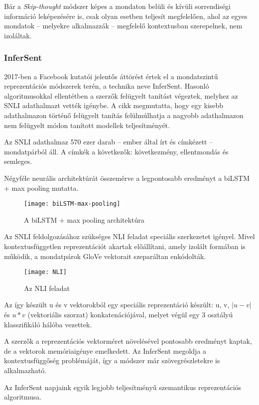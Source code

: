 Bár a \textit{Skip-thought} módszer képes a mondaton belüli és kívüli sorrendiségi információ leképezésére is, csak olyan esetben teljesít megfelelően, ahol az egyes mondatok – melyekre alkalmazzák – megfelelő kontextusban szerepelnek, nem izoláltak.

\subsubsection{InferSent}
2017-ben a Facebook kutatói jelentős áttörést értek el a mondatszintű reprezentációs módszerek terén, a technika neve InferSent. Hasonló algoritmusokkal ellentétben a szerzők felügyelt tanítást végeztek, melyhez az SNLI adathalmazt vették igénybe. A cikk megmutatta, hogy egy kisebb adathalmazon történő felügyelt tanítás felülmúlhatja a nagyobb adathalmazon nem felügyelt módon tanított modellek teljesítményét.

Az SNLI adathalmaz 570 ezer darab – ember által írt és címkézett – mondatpárból áll. A címkék a következők: következmény, ellentmondás és semleges.

Négyféle neurális architektúrát összemérve a legpontosabb eredményt a biLSTM + max pooling mutatta. 

\begin{figure}[H]
	\centering
	\texttt{[image: biLSTM-max-pooling]}
	\caption{A biLSTM + max pooling architektúra}
\end{figure}

Az SNLI feldolgozásához szükséges NLI feladat speciális szerkezetet igényel. Mivel kontextusfüggetlen reprezentációt akartak előállítani, amely izolált formában is működik, a mondatpárok GloVe vektorait szeparáltan enkódolták.

\begin{figure}[H]
	\centering
	\texttt{[image: NLI]}
	\caption{Az NLI feladat}
\end{figure}

Az így készült u és v vektorokból egy speciális reprezentáció készült: u, v, $\left| u - v \right|$ és $u \ast v$ (vektoriális szorzat) konkatenációjával, melyet végül egy 3 osztályú klasszifikáló hálóba vezettek.

A szerzők a reprezentációs vektorméret növelésével pontosabb eredményt kaptak, de a vektorok memóriaigénye emelkedett. Az InferSent megoldja a kontextusfüggőség problémáját, így a módszer már szövegrészletekre is alkalmazható.

\begin{note}
	Az InferSent napjaink egyik legjobb teljesítményű szemantikus reprezentációs algoritmusa.
\end{note}


